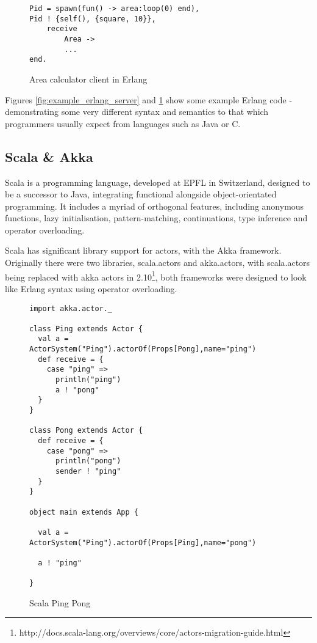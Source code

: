 \documentclass{article}
\begin{document}
\begin{figure}[H]
\begin{verbatim}
Pid = spawn(fun() -> area:loop(0) end),
Pid ! {self(), {square, 10}},
    receive
        Area ->
        ...
end.
\end{verbatim}
\caption{Area calculator client in Erlang}
\label{fig:example_erlang_client}
\end{figure}

Figures \ref{fig:example_erlang_server} and \ref{fig:example_erlang_client} show
some example Erlang code - demonstrating some very different syntax and
semantics to that which programmers usually expect from languages such as Java
or C.

\subsection{Scala \& Akka}

Scala is a programming language, developed at EPFL in Switzerland, designed to be
a successor to Java, integrating functional alongside object-orientated programming.
It includes a myriad of orthogonal features, including anonymous functions, lazy
initialisation, pattern-matching, continuations, type inference and operator overloading.

Scala has significant library support for actors, with the Akka framework. Originally there
were two libraries, scala.actors and akka.actors, with scala.actors being replaced with
akka actors in 2.10\footnote{http://docs.scala-lang.org/overviews/core/actors-migration-guide.html},
both frameworks were designed to look like Erlang syntax using operator overloading.

\begin{figure}[H]
\begin{verbatim}
import akka.actor._

class Ping extends Actor {
  val a = ActorSystem("Ping").actorOf(Props[Pong],name="ping")
  def receive = {
    case "ping" =>
      println("ping")
      a ! "pong"
  }
}

class Pong extends Actor {
  def receive = {
    case "pong" =>
      println("pong")
      sender ! "ping"
  }
}

object main extends App {

  val a = ActorSystem("Ping").actorOf(Props[Ping],name="pong")

  a ! "ping"

}
\end{verbatim}
\caption{Scala Ping Pong}
\label{fig:scala-ping-pong}
\end{figure}
\end{document}
